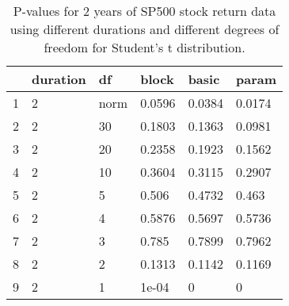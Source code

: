 \begin{table}[ht]
\centering
\caption{P-values for 2 years of SP500 stock return 
                   data using different durations
  and different degrees of freedom for Student's t distribution.} 
\label{table:SP5002}
\begin{tabular}{rlllll}
  \hline
 & duration & df & block & basic & param \\ 
  \hline
1 & 2 & norm & 0.0596 & 0.0384 & 0.0174 \\ 
  2 & 2 & 30 & 0.1803 & 0.1363 & 0.0981 \\ 
  3 & 2 & 20 & 0.2358 & 0.1923 & 0.1562 \\ 
  4 & 2 & 10 & 0.3604 & 0.3115 & 0.2907 \\ 
  5 & 2 & 5 & 0.506 & 0.4732 & 0.463 \\ 
  6 & 2 & 4 & 0.5876 & 0.5697 & 0.5736 \\ 
  7 & 2 & 3 & 0.785 & 0.7899 & 0.7962 \\ 
  8 & 2 & 2 & 0.1313 & 0.1142 & 0.1169 \\ 
  9 & 2 & 1 & 1e-04 & 0 & 0 \\ 
   \hline
\end{tabular}
\end{table}


